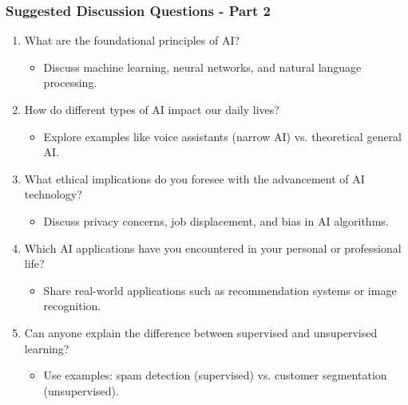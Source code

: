 \documentclass[aspectratio=169]{beamer}
\begin{document}
\begin{frame}[fragile]
    \frametitle{Suggested Discussion Questions - Part 2}
    \begin{enumerate}
        \item What are the foundational principles of AI?
            \begin{itemize}
                \item Discuss machine learning, neural networks, and natural language processing.
            \end{itemize}
        \item How do different types of AI impact our daily lives?
            \begin{itemize}
                \item Explore examples like voice assistants (narrow AI) vs. theoretical general AI.
            \end{itemize}
        \item What ethical implications do you foresee with the advancement of AI technology?
            \begin{itemize}
                \item Discuss privacy concerns, job displacement, and bias in AI algorithms.
            \end{itemize}
        \item Which AI applications have you encountered in your personal or professional life?
            \begin{itemize}
                \item Share real-world applications such as recommendation systems or image recognition.
            \end{itemize}
        \item Can anyone explain the difference between supervised and unsupervised learning?
            \begin{itemize}
                \item Use examples: spam detection (supervised) vs. customer segmentation (unsupervised).
            \end{itemize}
    \end{enumerate}
\end{frame}
\end{document}
